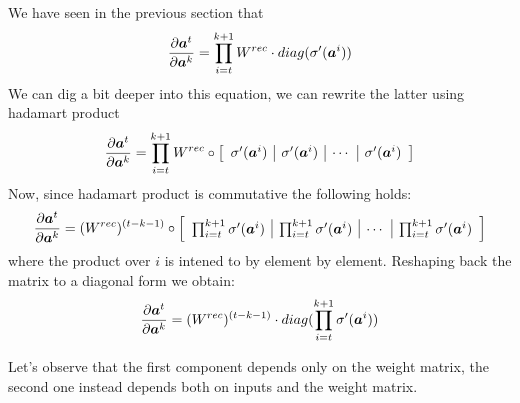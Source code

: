 We have seen in the previous section that
\begin{equation}
\frac{\partial \boldsymbol{a}^t}{\partial \boldsymbol{a}^k} = \prod_{i=t}^{k+1} W^{rec} \cdot diag(\sigma'(\boldsymbol{a}^i))
\end{equation}
We can dig a bit deeper into this equation, we can rewrite the latter using hadamart product
\begin{equation}
\frac{\partial \boldsymbol{a}^t}{\partial \boldsymbol{a}^k} = \prod_{i=t}^{k+1} W^{rec} \circ  
\left[
\begin{array}{c|c|c|c}
\sigma'(\boldsymbol{a}^i) & \sigma'(\boldsymbol{a}^i) & \cdots & \sigma'(\boldsymbol{a}^i) \\
\end{array}
\right]
\end{equation}
Now, since hadamart product is commutative the following holds:
\begin{equation}
\frac{\partial \boldsymbol{a}^t}{\partial \boldsymbol{a}^k} =  (W^{rec})^{(t-k-1)} \circ  
\left[
\begin{array}{c|c|c|c}
\prod_{i=t}^{k+1} \sigma'(\boldsymbol{a}^i) & \prod_{i=t}^{k+1} \sigma'(\boldsymbol{a}^i) & \cdots &  \prod_{i=t}^{k+1} \sigma'(\boldsymbol{a}^i) \\
\end{array}
\right]
\end{equation}
where the product over $i$ is intened to by element by element.
Reshaping back the matrix to a diagonal form we obtain:
\begin{equation}
\frac{\partial \boldsymbol{a}^t}{\partial \boldsymbol{a}^k} = (W^{rec})^{(t-k-1)} \cdot diag(\prod_{i=t}^{k+1}\sigma'(\boldsymbol{a}^i))
\end{equation}

Let's observe that the first component depends only on the weight matrix, the second one instead depends both on inputs and the weight matrix.
